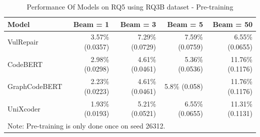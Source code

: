 \begin{table}[H]
\centering
  \caption{Model Performance on RQ1, RQ2B and RQ3B - CWE-352}
  \label{Appendices:RQ1-RQ2B-CWE-352}
\end{table}
%
%
%
\begin{table}[H]
\centering
  \caption{Performance Of Models on RQ5 using RQ3B dataset - Pre-training}
  \label{Appendices:RQ5-pretrain}
  \begin{tabular}{|l|r|r|r|r|}
    \hline
    Model          & Beam = 1 & Beam = 3 & Beam = 5 & Beam = 50\\
    \hline
    VulRepair       & 3.57\% (0.0357)  & 7.29\% (0.0729) & 7.59\% (0.0759)  & 6.55\% (0.0655) \\
    \hline
    CodeBERT        & 2.98\% (0.0298)  & 4.61\% (0.0461) & 5.36\% (0.0536)  & 11.76\% (0.1176) \\
    \hline
    GraphCodeBERT   & 2.23\% (0.0223)  & 4.61\% (0.0461) & 5.8\% (0.058)    & 11.76\% (0.1176) \\
    \hline
    UniXcoder       & 1.93\% (0.0193)  & 5.21\% (0.0521) & 6.55\% (0.0655)  & 11.31\% (0.1131) \\
    \hline
    \multicolumn{5}{l}{Note: Pre-training is only done once on seed 26312.}\\
  \end{tabular}
\end{table}
